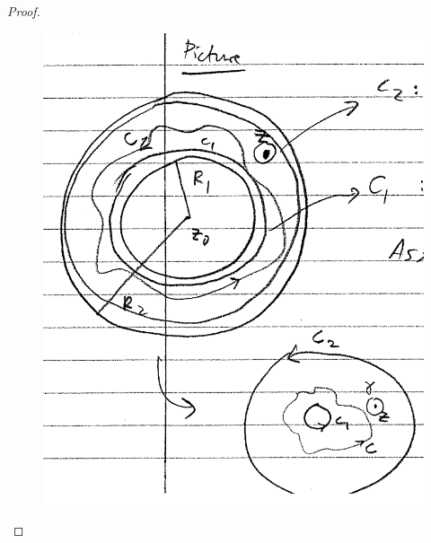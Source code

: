 \documentclass{article}
\theoremstyle{definition}
\begin{document}
\begin{proof}
	\begin{figure}[!htb]
		\centering
		\includegraphics[scale=0.25]{laurent}
	\end{figure}
	

\end{proof}
\end{document}
